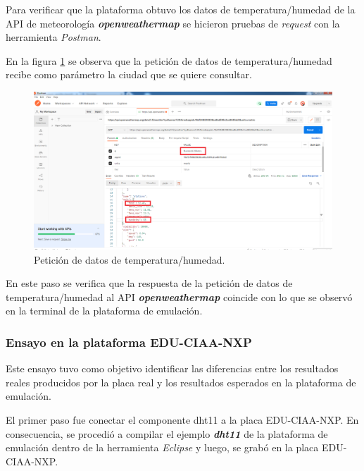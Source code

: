 Para verificar que la plataforma obtuvo los datos de temperatura/humedad de la API de meteorología  \textit{\textbf{openweathermap}} se hicieron pruebas de \textit{request} con la herramienta \textit{Postman}.

En la figura \ref{fig:RespuestaPostMan1} se observa que la petición de datos de temperatura/humedad recibe como parámetro la ciudad que se quiere consultar.

\hfill \break
\hfill \break
\hfill \break
\hfill \break



\begin{figure}[ht]
	\centering
	\includegraphics[scale=.30]{./Figures/RespuestaPostMan1.png}
	\caption{Petición de datos de temperatura/humedad.}
	\label{fig:RespuestaPostMan1}
\end{figure}

En este paso se verifica que la respuesta de la petición de datos de temperatura/humedad al API \textit{\textbf{openweathermap}} coincide con lo que se observó en la terminal de la plataforma de emulación.


\subsubsection{Ensayo en la plataforma EDU-CIAA-NXP} 

Este ensayo tuvo como objetivo identificar
las diferencias entre los resultados reales producidos por la placa real y los resultados esperados en la plataforma de emulación.

El primer paso fue conectar el componente dht11 a la placa EDU-CIAA-NXP. En consecuencia, se procedió a compilar el ejemplo \textit{\textbf{dht11}} de la plataforma de emulación dentro de la herramienta 
\textit{Eclipse} y luego, se grabó en la placa EDU-CIAA-NXP.

